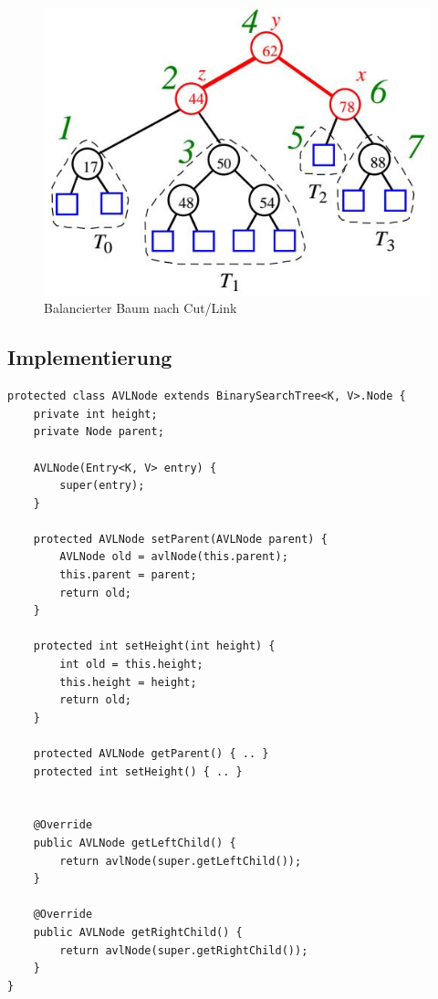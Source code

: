 \begin{figure}[h]
	\centering
	\includegraphics[width=0.6\linewidth]{images/cut_link_restruction_solution}
	\caption{Balancierter Baum nach Cut/Link}
	\label{fig:cutlinkrestructionsolution}
\end{figure}



\subsection{Implementierung}
\begin{lstlisting}[caption=AVL Tree Node]
protected class AVLNode extends BinarySearchTree<K, V>.Node {
	private int height;
	private Node parent;

	AVLNode(Entry<K, V> entry) {
		super(entry);
	}

	protected AVLNode setParent(AVLNode parent) {
		AVLNode old = avlNode(this.parent);
		this.parent = parent;
		return old;
	}

	protected int setHeight(int height) {
		int old = this.height;
		this.height = height;
		return old;
	}

	protected AVLNode getParent() { .. }
	protected int setHeight() { .. }


	@Override
	public AVLNode getLeftChild() {
		return avlNode(super.getLeftChild());
	}

	@Override
	public AVLNode getRightChild() {
		return avlNode(super.getRightChild());
	}
}
\end{lstlisting}

